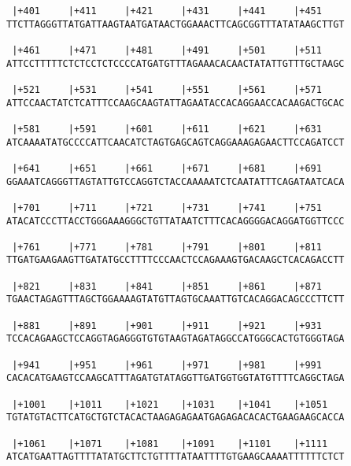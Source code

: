 \documentclass{article}
\begin{document}
\begin{Verbatim}
 |+401     |+411     |+421     |+431     |+441     |+451    
TTCTTAGGGTTATGATTAAGTAATGATAACTGGAAACTTCAGCGGTTTATATAAGCTTGT
                                                            
 |+461     |+471     |+481     |+491     |+501     |+511    
ATTCCTTTTTCTCTCCTCTCCCCATGATGTTTAGAAACACAACTATATTGTTTGCTAAGC
                                                            
 |+521     |+531     |+541     |+551     |+561     |+571    
ATTCCAACTATCTCATTTCCAAGCAAGTATTAGAATACCACAGGAACCACAAGACTGCAC
                                                            
 |+581     |+591     |+601     |+611     |+621     |+631    
ATCAAAATATGCCCCATTCAACATCTAGTGAGCAGTCAGGAAAGAGAACTTCCAGATCCT
                                                            
 |+641     |+651     |+661     |+671     |+681     |+691    
GGAAATCAGGGTTAGTATTGTCCAGGTCTACCAAAAATCTCAATATTTCAGATAATCACA
                                                            
 |+701     |+711     |+721     |+731     |+741     |+751    
ATACATCCCTTACCTGGGAAAGGGCTGTTATAATCTTTCACAGGGGACAGGATGGTTCCC
                                                            
 |+761     |+771     |+781     |+791     |+801     |+811    
TTGATGAAGAAGTTGATATGCCTTTTCCCAACTCCAGAAAGTGACAAGCTCACAGACCTT
                                                            
 |+821     |+831     |+841     |+851     |+861     |+871    
TGAACTAGAGTTTAGCTGGAAAAGTATGTTAGTGCAAATTGTCACAGGACAGCCCTTCTT
                                                            
 |+881     |+891     |+901     |+911     |+921     |+931    
TCCACAGAAGCTCCAGGTAGAGGGTGTGTAAGTAGATAGGCCATGGGCACTGTGGGTAGA
                                                            
 |+941     |+951     |+961     |+971     |+981     |+991    
CACACATGAAGTCCAAGCATTTAGATGTATAGGTTGATGGTGGTATGTTTTCAGGCTAGA
                                                            
 |+1001    |+1011    |+1021    |+1031    |+1041    |+1051   
TGTATGTACTTCATGCTGTCTACACTAAGAGAGAATGAGAGACACACTGAAGAAGCACCA
                                                            
 |+1061    |+1071    |+1081    |+1091    |+1101    |+1111   
ATCATGAATTAGTTTTATATGCTTCTGTTTTATAATTTTGTGAAGCAAAATTTTTTCTCT
                                                            

\end{Verbatim}
\end{document}
